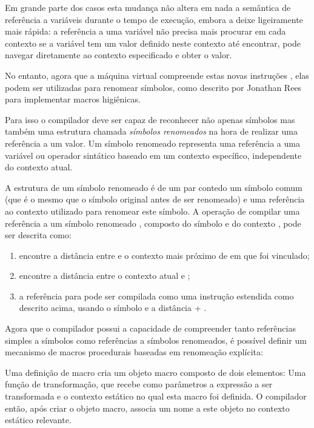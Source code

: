 Em grande parte dos casos esta mudança não altera em nada a semântica de
referência a variáveis durante o tempo de execução, embora a deixe ligeiramente
mais rápida: a referência a uma variável não precisa mais procurar em cada
contexto se a variável tem um valor definido neste contexto até encontrar, pode
navegar diretamente ao contexto especificado e obter o valor.

No entanto, agora que a máquina virtual compreende estas novas instruções
, elas podem ser utilizadas para renomear símbolos, como descrito
por Jonathan Rees\cite{scheme-of-things} para implementar macros higiênicas.

Para isso o compilador deve ser capaz de reconhecer
não apenas símbolos mas também uma estrutura chamada \textit{símbolos
renomeados} na hora de realizar uma referência a um valor. Um símbolo renomeado
representa uma referência a uma variável ou operador sintático baseado em um
contexto específico, independente do contexto atual.

A estrutura de um símbolo renomeado é de um par contedo um símbolo comum (que é
o mesmo que o símbolo original antes de ser renomeado) e uma referência ao
contexto utilizado para renomear este símbolo. A operação de compilar uma
referência a um símbolo renomeado , composto do símbolo  e do
contexto , pode ser descrita como: 

\begin{enumerate}

\item encontre a distância  entre  e o contexto mais próximo
de  em que  foi vinculado;
 
\item encontre a distância  entre o contexto atual e ;

\item a referência para  pode ser compilada como uma instrução 
 estendida como descrito acima, usando o símbolo  e a 
distância  + . 

\end{enumerate}

Agora que o compilador possui a capacidade de compreender tanto referências
simples a símbolos como referências a símbolos renomeados, é possível definir
um mecanismo de macros procedurais baseadas em renomeação explícita:

Uma definição de macro cria um objeto macro composto de dois elementos: Uma
função de transformação, que recebe como parâmetros a expressão a ser
transformada e o contexto estático no qual esta macro foi definida. O
compilador então, após criar o objeto macro, associa um nome a este objeto no
contexto estático relevante.

